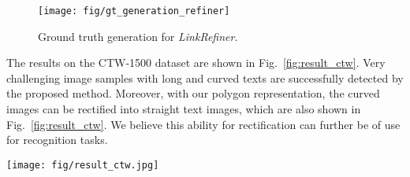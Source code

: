 \documentclass[10pt,twocolumn,letterpaper]{article}
\begin{document}
\begin{figure}[t]
	\begin{center}
        \texttt{[image: fig/gt\_generation\_refiner]}
        \caption{Ground truth generation for \textit{LinkRefiner}.}
  	    \label{fig:gt_generation_refiner} 
    \end{center}
    \vspace{-1.5mm}
\end{figure}


The results on the CTW-1500 dataset are shown in Fig.~\ref{fig:result_ctw}. Very challenging image samples with long and curved texts are successfully detected by the proposed method. Moreover, with our polygon representation, the curved images can be rectified into straight text images, which are also shown in Fig.~\ref{fig:result_ctw}. We believe this ability for rectification can further be of use for recognition tasks.

\begin{figure*}[t]
  \centering
  \texttt{[image: fig/result\_ctw.jpg]}
  \caption{Results on CTW-1500 dataset. For each cluster: the input image (top), region score (middle left), link score (middle right), and the resulting rectified polygons for curved texts (bottom, below arrow) are shown. Note that the affinity scores are not rendered and are unused in the CTW-1500 dataset.} 
  \label{fig:result_ctw} 
\end{figure*}


 
\end{document}

